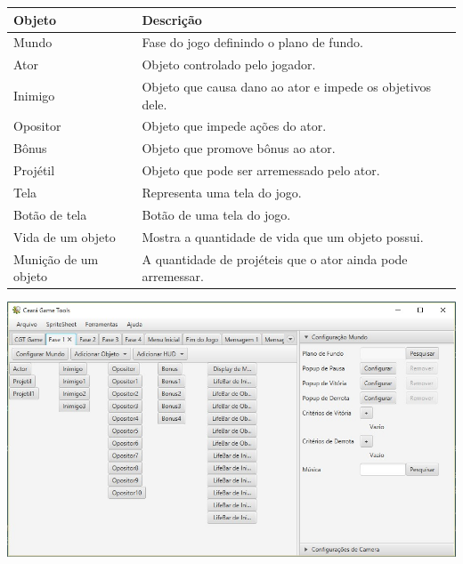 \documentclass{beamer}
\begin{document}
   \begin{frame}

      {\footnotesize
      \begin{tabular}{ l | p{7cm} }
         \textbf{Objeto} & \textbf{Descrição} \\
         \hline
         Mundo & Fase do jogo definindo o plano de fundo.  \\
         \hline
         Ator & Objeto controlado pelo jogador. \\
         \hline
         Inimigo & Objeto que causa dano ao ator e impede os objetivos dele. \\
         \hline
         Opositor & Objeto que impede ações do ator.  \\
         \hline
         Bônus & Objeto que promove bônus ao ator. \\
         \hline
         Projétil & Objeto que pode ser arremessado pelo ator. \\
         \hline
         Tela & Representa uma tela do jogo. \\
         \hline
         Botão de tela & Botão de uma tela do jogo. \\
         \hline
         Vida de um objeto & Mostra a quantidade de vida que um objeto possui. \\
         \hline
         Munição de um objeto & A quantidade de projéteis que o ator ainda pode arremessar. \\
      \end{tabular}}
   \end{frame}

   \begin{frame}
      \includegraphics[width=\textwidth]{images/objetos_disposicao.jpg}
   \end{frame}
\end{document}
